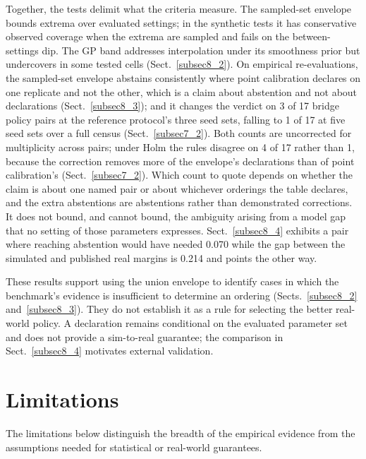 \documentclass[pdflatex,iicol,sn-apa]{sn-jnl}
\theoremstyle{remark}
\begin{document}
Together, the tests delimit what the criteria measure. The sampled-set envelope bounds extrema
over evaluated settings; in the synthetic tests it has conservative observed coverage when the
extrema are sampled and fails on the between-settings dip. The GP band addresses interpolation
under its smoothness prior but undercovers in some tested cells (Sect.~\ref{subsec8_2}).
On empirical re-evaluations, the sampled-set envelope abstains consistently where point calibration
declares on one replicate and not the other, which is a claim about abstention and not about
declarations (Sect.~\ref{subsec8_3}); and it changes the verdict on 3 of 17 bridge policy pairs at
the reference protocol's three seed sets, falling to 1 of 17 at five seed sets over a full census
(Sect.~\ref{subsec7_2}). Both counts are uncorrected for multiplicity across pairs; under Holm the
rules disagree on 4 of 17 rather than 1, because the correction removes more of the envelope's
declarations than of point calibration's (Sect.~\ref{subsec7_2}). Which count to quote depends on
whether the claim is about one named pair or about whichever orderings the table declares, and the
extra abstentions are abstentions rather than demonstrated corrections. It does not bound, and cannot bound, the ambiguity arising from a model gap
that no setting of those parameters expresses. Sect.~\ref{subsec8_4} exhibits a pair where
reaching abstention would have needed 0.070 while the gap between the simulated and published real
margins is 0.214 and points the other way.

These results support using the union envelope to identify cases in which the benchmark's
evidence is insufficient to determine an ordering (Sects.~\ref{subsec8_2} and~\ref{subsec8_3}).
They do not establish it as a rule for selecting the better real-world policy. A declaration
remains conditional on the evaluated parameter set and does not provide a sim-to-real
guarantee; the comparison in Sect.~\ref{subsec8_4} motivates external validation.

\section{Limitations}\label{sec9}

The limitations below distinguish the breadth of the empirical evidence from the assumptions
needed for statistical or real-world guarantees.
\end{document}
